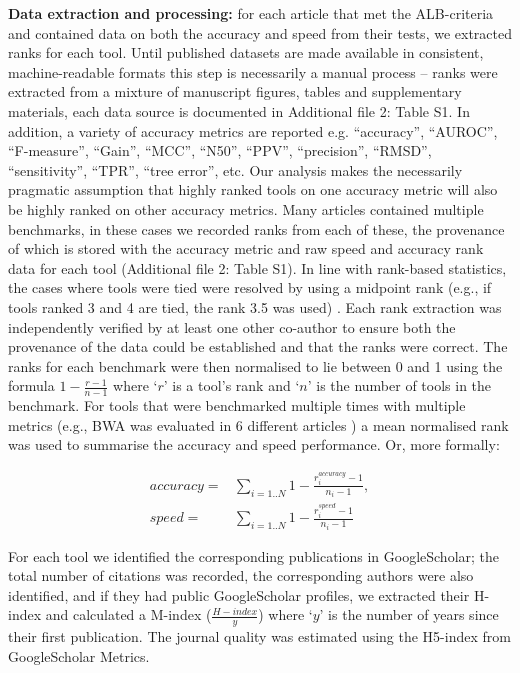 \documentclass{bmcart}
\begin{document}
\textbf{Data extraction and processing:} for each article that met the
ALB-criteria and contained data on both the accuracy and speed from
their tests, we extracted ranks for each tool. {\color{red}Until
  published datasets are made available in consistent,
  machine-readable formats this step is necessarily a manual process
  -- ranks were extracted from a mixture of manuscript figures, tables
  and supplementary materials, each data source is documented in
 Additional file 2: Table S1. In addition, a variety of
  accuracy metrics are reported e.g. ``accuracy'', ``AUROC'',
  ``F-measure'', ``Gain'', ``MCC'', ``N50'', ``PPV'', ``precision'',
  ``RMSD'', ``sensitivity'', ``TPR'', ``tree error'', etc. Our
  analysis makes the necessarily pragmatic assumption that highly
  ranked tools on one accuracy metric will also be highly ranked on
  other accuracy metrics.}  Many articles contained multiple
benchmarks, in these cases we recorded ranks from each of these, the
provenance of which is stored with the accuracy metric and raw speed
and accuracy rank data for each tool {\color{red}(Additional file 2:
  Table S1)}. In line with rank-based statistics, the cases where
tools were tied were resolved by using a midpoint rank (e.g., if tools
ranked 3 and 4 are tied, the rank 3.5 was used)
\cite{Mann1947-re}. Each rank extraction was independently verified by
at least one other co-author to ensure both the provenance of the data
could be established and that the ranks were correct. The ranks for
each benchmark were then normalised to lie between 0 and 1 using the
formula $1-\frac{r-1}{n-1}$ where ‘$r$’ is a tool’s rank and ‘$n$’ is
the number of tools in the benchmark. For tools that were benchmarked
multiple times with multiple metrics (e.g., BWA was evaluated in 6
different articles
\cite{Bao2011-lv,Caboche2014-lj,Hatem2013-cs,Schbath2012-ob,Ruffalo2011-rl,Holtgrewe2011-fd})
a mean normalised rank was used to summarise the accuracy and speed
performance.  Or, more formally:
 
\begin{equation*}
\begin{split}
accuracy =& \sum_{i=1..N} 1-\frac{r^{accuracy}_i-1}{n_i-1}, \\
speed    =& \sum_{i=1..N} 1-\frac{r^{speed   }_i-1}{n_i-1}
\end{split}
\end{equation*}
 
For each tool we identified the corresponding publications in
GoogleScholar; the total number of citations was recorded, the
corresponding authors were also identified, and if they had public
GoogleScholar profiles, we extracted their H-index and calculated a
M-index ($\frac{H-index}{y}$) where ‘$y$’ is the number of years since
their first publication. The journal quality was estimated using the H5-index
from GoogleScholar Metrics. 
\end{document}
